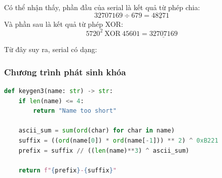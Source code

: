 Có thể nhận thấy, phần đầu của serial là kết quả từ phép chia:
\[
32707169 \div 679 = \underline{48271}
\]
Và phần sau là kết quả từ phép XOR:
\[
5720^2\ \mathrm{XOR}\ 45601 = \underline{32707169}
\]

Từ đây suy ra, serial có dạng:


\subsubsection{Chương trình phát sinh khóa}
\begin{lstlisting}[language=Python, caption={Chương trình phát sinh khóa}] 
def keygen3(name: str) -> str:
    if len(name) <= 4:
        return "Name too short"

    ascii_sum = sum(ord(char) for char in name)
    suffix = ((ord(name[0]) * ord(name[-1])) ** 2) ^ 0xB221
    prefix = suffix // ((len(name)**3) ^ ascii_sum)

    return f"{prefix}-{suffix}"
\end{lstlisting}